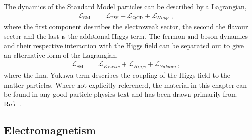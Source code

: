 The dynamics of the Standard Model particles can be described by a Lagrangian,
\begin{align}
\mathcal{L}_{\mathrm{SM}} &= \mathcal{L}_{\mathrm{EW}} + \mathcal{L}_{\mathrm{QCD}} + \mathcal{L}_{Higgs} \, ,
\end{align}
where the first component describes the electroweak sector, the second the flavour sector and the last is the additional Higgs term. 
The fermion and boson dynamics and their respective interaction with the Higgs field
can be separated out to give an alternative form of the Lagrangian,
\begin{align}
\mathcal{L}_{\mathrm{SM}} &= \mathcal{L}_{Kinetic} + \mathcal{L}_{Higgs} + \mathcal{L}_{Yukawa}  \, ,
\end{align}
where the final Yukawa term describes the coupling of the Higgs field to the matter particles.
Where not explicitly referenced, the material in this chapter can be found in any good particle physics text and 
has been drawn primarily from Refs~\cite{Abers:1973qs,Halzen:1984mc,Manohar:2000dt,Mannel:2004ce}.

\subsection{Electromagnetism}

